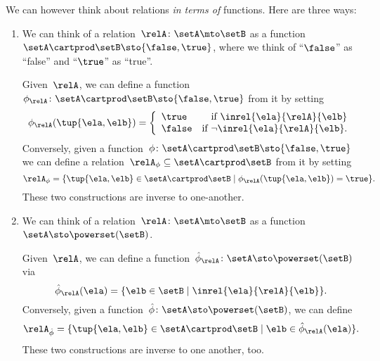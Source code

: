 \begin{remark}
    \label{re:rel-three-fun-descriptions}
    We can however think about relations \emph{in terms of} functions.
    Here are three ways:
    \begin{enumerate}
        \item We can think of a relation~$\relA \colon \setA \mto\setB$ as a function~$\setA \cartprod \setB \sto \{ \false, \true \}$, where we think of ``$\false$'' as ``false'' and ``$\true$'' as ``true''.
        
        Given~$\relA$, we can define a function~$\phi_{\relA} \colon \setA \cartprod \setB \sto \{ \false, \true \}$ from it by setting
        \begin{equation}
            \phi_{\relA}(\tup{\ela, \elb}) =
            \left
            \{\begin{array}{lr}
                  \true  & \text{if } \inrel{\ela}{\relA}{\elb}      \\
                  \false & \text{if } \neg\inrel{\ela}{\relA}{\elb}.
            \end{array}
            \right.
        \end{equation}
        Conversely, given a function~$\phi\colon \setA \cartprod \setB \sto \{ \false, \true \}$ we can define a relation~$\relA_{\phi} \subseteq \setA \cartprod \setB$ from it by setting
        \begin{equation}
            \relA_{\phi} = \{ \tup{\ela, \elb} \in \setA \cartprod \setB \mid \phi_{\relA}(\tup{\ela, \elb}) = \true \}.
        \end{equation}
        These two constructions are inverse to one-another.
        
        \item We can think of a relation~$\relA \colon \setA \mto \setB$ as a function~$\setA  \sto \powerset (\setB)$.
        
        Given~$\relA$, we can define a function~$\hat \phi_{\relA} \colon \setA \sto \powerset (\setB)$ via
        \begin{equation}
            \hat \phi_{\relA} (\ela) = \{ \elb \in \setB \mid \inrel{\ela}{\relA}{\elb}\}.
        \end{equation}
        Conversely, given a function~$\hat \phi \colon \setA \sto \powerset (\setB)$, we can define
        \begin{equation}
            \relA_{\hat \phi} = \{ \tup{\ela, \elb} \in \setA \cartprod \setB \mid \elb \in \hat \phi_{\relA}(\ela)   \}.
        \end{equation}
        These two constructions are inverse to one another, too.
        

\end{enumerate}
\end{remark}
